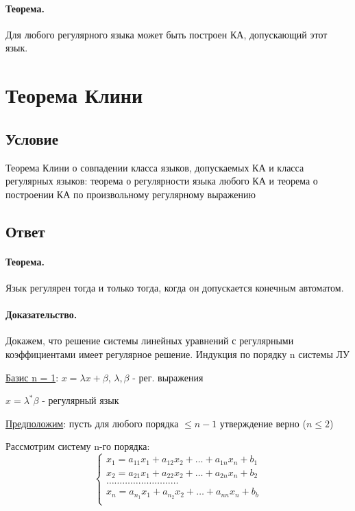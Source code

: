 \documentclass{report}
\begin{document}
\paragraph*{Теорема.}
Для любого регулярного языка может быть построен КА, допускающий этот язык.

\newpage

\section{Теорема Клини}
\subsection{Условие}
Теорема Клини о совпадении класса языков, допускаемых КА и класса регулярных
языков: теорема о регулярности языка любого КА и теорема о построении КА по
произвольному регулярному выражению

\subsection{Ответ}
\paragraph*{Теорема.}
Язык регулярен тогда и только тогда, когда он допускается конечным автоматом.
\paragraph*{Доказательство.}
Докажем, что решение системы линейных уравнений с
регулярными коэффициентами имеет регулярное решение.
Индукция по порядку n системы ЛУ

\underline{Базис n = 1}: $x = \lambda x + \beta$,  $\lambda,\beta$ - рег. выражения

 $x=\lambda^{*}\beta$ - регулярный язык

 \medskip

 \underline{Предположим}: пусть для любого порядка $\le  n - 1$ утверждение верно ($n \le 2$)

Рассмотрим систему n-го порядка:
\[
\begin{cases}
	x_1=a_{11}x_1+a_{12}x_2+\ldots+a_{1n}x_{n}+b_1\\
	x_2=a_{21}x_1+a_{22}x_2+\ldots+a_{2n}x_{n}+b_2\\
	\ldots\ldots\ldots\ldots\ldots\ldots\ldots\ldots\ldots\\
	x_{n}=a_{n_1}x_1+a_{n_2}x_2+\ldots+a_{nn}x_{n}+b_{b}\\
\end{cases}
\] 
\end{document}

